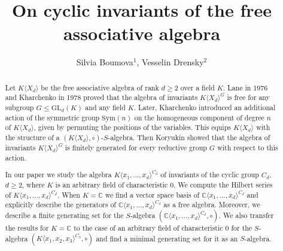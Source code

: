 \documentclass{amsart}
\theoremstyle{definition}
\begin{document}

\title[On cyclic invariants of the free associative algebra]
{On cyclic invariants of the free associative algebra}

\author[Silvia Boumova, Vesselin Drensky]
{Silvia Boumova$^{1}$, Vesselin Drensky$^{2}$ }
\address{$^{1}$Faculty of Mathematics and Informatics,
Sofia University, 1164 Sofia, Bulgaria and Institute of Mathematics and Informatics,
Bulgarian Academy of Sciences,
1113 Sofia, Bulgaria\\}
\address{$^{2}$Institute of Mathematics and Informatics,
Bulgarian Academy of Sciences,
1113 Sofia, Bulgaria}




\begin{abstract}

Let $K\langle X_d\rangle$ be the free associative algebra of rank $d \geq 2$ over a field $K$.
Lane in 1976 and Kharchenko in 1978 proved that the algebra of invariants $K\langle X_d\rangle^G$ is free for any subgroup $G \leq \text{GL}_d(K)$ and any field $K$.
Later, Kharchenko introduced an additional action of the symmetric group $\text{Sym}(n)$ on the homogeneous component of degree $n$ of $K\langle X_d\rangle$,
given by permuting the positions of the variables. This equips $K\langle X_d\rangle$ with the structure of a $(K\langle X_d\rangle,\circ)$-$S$-algebra.
Then Koryukin showed that the algebra of invariants $K\langle X_d\rangle^G$ is finitely generated for every reductive group $G$ with respect to this action.

In our paper we study the algebra $K\langle x_1,\ldots,x_d\rangle^{C_d}$ of invariants of the cyclic group $C_d$, $d\geq 2$, where $K$ is an arbitrary field of characteristic 0.
We compute the Hilbert series of $K\langle x_1,\ldots,x_d \rangle^{C_d}$. When $K=\mathbb C$ we find a vector space basis of ${\mathbb C}\langle x_1,\ldots,x_d \rangle^{C_d}$
and explicitly describe the generators of ${\mathbb C}\langle x_1,\ldots,x_d \rangle^{C_d}$ as a free algebra.
Moreover, we describe a finite generating set for the $S$-algebra $({\mathbb C}\langle x_1,\ldots,x_d \rangle^{C_d},\circ)$.
We also transfer the results for $K=\mathbb C$ to the case of an arbitrary field of characteristic 0 for the $S$-algebra $(K\langle x_1,x_2,x_3 \rangle^{C_3},\circ)$
and find a minimal generating set for it as an $S$-algebra.
\end{abstract}
\end{document}
